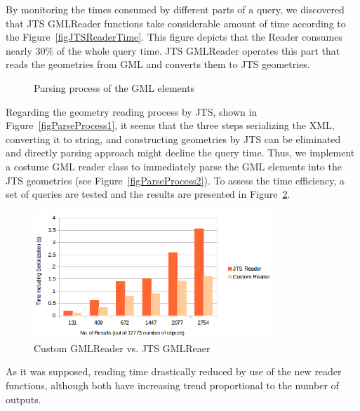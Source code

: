\documentclass[a4paper,12pt]{article}
\begin{document}
By monitoring the times consumed by different parts of a query, we discovered that JTS GMLReader functions take considerable amount of time according to the Figure~\ref{figJTSReaderTime}. This figure depicts that the Reader consumes nearly $30\%$ of the whole query time. JTS GMLReader operates this part that reads the geometries from GML and converts them to JTS geometries. 
\begin{figure}
\centering
{}
\centering
{}
\caption{Parsing process of the GML elements}
\label{figParseProcess}
\end{figure}
Regarding the geometry reading process by JTS, shown in Figure~\ref{figParseProcess1}, it seems that the three steps serializing the XML, converting it to string, and constructing geometries by JTS can be eliminated and directly parsing approach might decline the query time. Thus, we implement a costume GML reader class to immediately parse the GML elements into the JTS geometries (see Figure~\ref{figParseProcess2}). To assess the time efficiency, a set of queries are tested and the results are presented in Figure~\ref{figGmlReader}. 
\begin{figure}
\centering
\includegraphics[width=0.8\textwidth]{GmlReader-2}
\caption{Custom GMLReader vs. JTS GMLReaer}
\label{figGmlReader}
\end{figure}
As it was supposed, reading time drastically reduced by use of the new reader functions, although both have increasing trend proportional to the number of outputs.%
\end{document}

